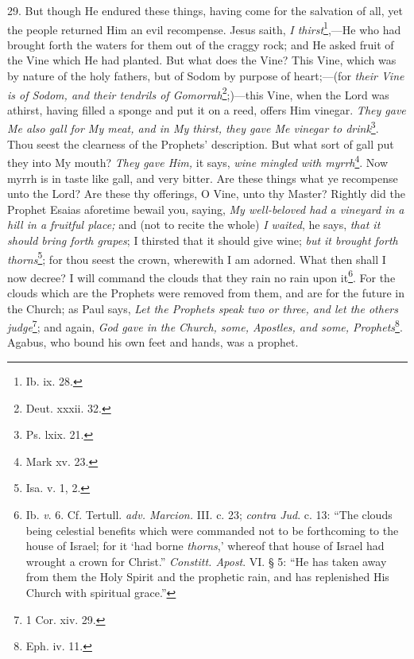29. But though He endured these things, having come for the salvation of all, yet the people returned Him an evil recompense. Jesus saith, \emph{I thirst}\footnote{Ib. ix. 28.},—He who had brought forth the waters for them out of the craggy rock; and He asked fruit of the Vine which He had planted. But what does the Vine? This Vine, which was by nature of the holy fathers, but of Sodom by purpose of heart;—(for \emph{their Vine is of Sodom, and their tendrils of Gomorrah}\footnote{Deut. xxxii. 32.};)—this Vine, when the Lord was athirst, having filled a sponge and put it on a reed, offers Him vinegar. \emph{They gave Me also gall for My meat, and in My thirst, they gave Me vinegar to drink}\footnote{Ps. lxix. 21.}. Thou seest the clearness of the Prophets’ description. But what sort of gall put they into My mouth? \emph{They gave Him,} it says, \emph{wine mingled with myrrh}\footnote{Mark xv. 23.}. Now myrrh is in taste like gall, and very bitter. Are these things what ye recompense unto the Lord? Are these thy offerings, O Vine, unto thy Master? Rightly did the Prophet Esaias aforetime bewail you, saying, \emph{My well-beloved had a vineyard in a hill in a fruitful place;} and (not to recite the whole) \emph{I waited}, he says, \emph{that it should bring forth grapes}; I thirsted that it should give wine; \emph{but it brought forth thorns}\footnote{Isa. v. 1, 2.}; for thou seest the crown, wherewith I am adorned. What then shall I now decree? I will command the clouds that they rain no rain upon it\footnote{Ib. \emph{v}. 6. Cf. Tertull. \emph{adv. Marcion.} III. c. 23; \emph{contra Jud}. c. 13: “The clouds being celestial benefits which were commanded not to be forthcoming to the house of Israel; for it ‘had borne \emph{thorns},’ whereof that house of Israel had wrought a crown for Christ.” \emph{Constitt. Apost}. VI. § 5: “He has taken away from them the Holy Spirit and the prophetic rain, and has replenished His Church with spiritual grace.”}. For the clouds which are the Prophets were removed from them, and are for the future in the Church; as Paul says, \emph{Let the Prophets speak two or three, and let the others judge}\footnote{1 Cor. xiv. 29.}; and again, \emph{God gave in the Church, some, Apostles, and some, Prophets}\footnote{Eph. iv. 11.}. Agabus, who bound his own feet and hands, was a prophet.

